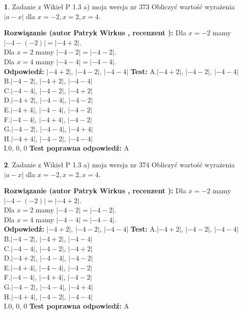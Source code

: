 \documentclass[12pt, a4paper]{article}
\theoremstyle{definition} %
\newtheorem{zad}{}
\newcommand{\zadStart}[1]{\begin{zad}#1\newline}
\newcommand{\zadStop}{\end{zad}}
\newcommand{\rozwStart}[2]{\noindent \textbf{Rozwiązanie (autor #1 , recenzent #2): }\newline}
\newcommand{\rozwStop}{\newline}
\newcommand{\odpStart}{\noindent \textbf{Odpowiedź:}\newline}
\newcommand{\odpStop}{\newline}
\newcommand{\testStart}{\noindent \textbf{Test:}\newline}
\newcommand{\testStop}{\newline}
\newcommand{\kluczStart}{\noindent \textbf{Test poprawna odpowiedź:}\newline}
\newcommand{\kluczStop}{\newline}
\begin{document}
\zadStart{Zadanie z Wikieł P 1.3 a) moja wersja nr 373}
Obliczyć wartość wyrażenia $|a - x|$ dla $x=-2,x=2,x=4$.
\zadStop
\rozwStart{Patryk Wirkus}{}
Dla $x = -2$ mamy $|-4 - (-2)| = |-4 + 2|$.\\
Dla $x = 2$ mamy $|-4 - 2| = |-4 - 2|$.\\
Dla $x = 4$ mamy $|-4 - 4| = |-4 - 4|$.\\
\rozwStop
\odpStart
$|-4 + 2|$, $|-4 - 2|$, $|-4 - 4|$
\odpStop
\testStart
A.$|-4 + 2|$, $|-4 - 2|$, $|-4 - 4|$\\
B.$|-4 - 2|$, $|-4 + 2|$, $|-4 - 4|$\\
C.$|-4 - 4|$, $|-4 - 2|$, $|-4 + 2|$\\
D.$|-4 + 2|$, $|-4 - 4|$, $|-4 - 2|$\\
E.$|-4 + 4|$, $|-4 - 4|$, $|-4 - 2|$\\
F.$|-4 - 4|$, $|-4 + 4|$, $|-4 - 2|$\\
G.$|-4 - 2|$, $|-4 - 4|$, $|-4 + 4|$\\
H.$|-4 + 4|$, $|-4 - 2|$, $|-4 - 4|$\\
I.$0$, $0$, $0$
\testStop
\kluczStart
A
\kluczStop



\zadStart{Zadanie z Wikieł P 1.3 a) moja wersja nr 374}
Obliczyć wartość wyrażenia $|a - x|$ dla $x=-2,x=2,x=4$.
\zadStop
\rozwStart{Patryk Wirkus}{}
Dla $x = -2$ mamy $|-4 - (-2)| = |-4 + 2|$.\\
Dla $x = 2$ mamy $|-4 - 2| = |-4 - 2|$.\\
Dla $x = 4$ mamy $|-4 - 4| = |-4 - 4|$.\\
\rozwStop
\odpStart
$|-4 + 2|$, $|-4 - 2|$, $|-4 - 4|$
\odpStop
\testStart
A.$|-4 + 2|$, $|-4 - 2|$, $|-4 - 4|$\\
B.$|-4 - 2|$, $|-4 + 2|$, $|-4 - 4|$\\
C.$|-4 - 4|$, $|-4 - 2|$, $|-4 + 2|$\\
D.$|-4 + 2|$, $|-4 - 4|$, $|-4 - 2|$\\
E.$|-4 + 4|$, $|-4 - 4|$, $|-4 - 2|$\\
F.$|-4 - 4|$, $|-4 + 4|$, $|-4 - 2|$\\
G.$|-4 - 2|$, $|-4 - 4|$, $|-4 + 4|$\\
H.$|-4 + 4|$, $|-4 - 2|$, $|-4 - 4|$\\
I.$0$, $0$, $0$
\testStop
\kluczStart
A
\kluczStop
\end{document}
